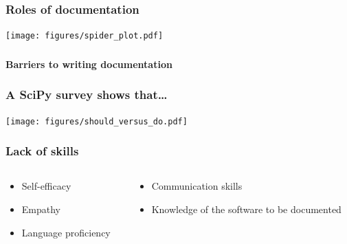 \documentclass[xcolor=dvipsnames]{beamer}
\begin{document}
\begin{frame}
\frametitle{Roles of documentation}
\texttt{[image: figures/spider\_plot.pdf]}
\end{frame}

\begin{frame}
\frametitle{}
{\Large \bf Barriers to writing documentation}
\end{frame}

\begin{frame}
\frametitle{A SciPy survey shows that\dots}
\texttt{[image: figures/should\_versus\_do.pdf]}
\end{frame}

\begin{frame}
\frametitle{Lack of skills}
\begin{overlayarea}{12cm}{3cm}
\begin{columns}
\begin{column}{0.5\linewidth}
\begin{itemize}[label={$\bullet$}]
\item<1-> Self-efficacy
\item<2-> Empathy
\item<3-> Language proficiency
\end{itemize}
\end{column}
\begin{column}{0.5\linewidth}
\begin{itemize}[label={$\bullet$}]
\item<4-> Communication skills
\item<5-> Knowledge of the software to be documented
\end{itemize}
\end{column}
\end{columns}
\end{overlayarea}
\begin{overlayarea}{12cm}{6cm}
\em
{}


\end{overlayarea}
\end{frame}
\end{document}
